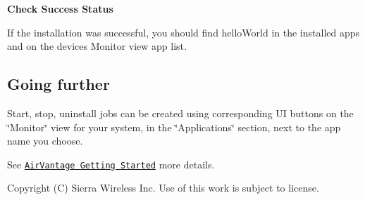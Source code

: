 {\bfseries Check Success Status}

If the installation was successful, you should find hello\+World in the installed apps and on the devices\textquotesingle{} Monitor view app list.\hypertarget{how_to_a_v_install_app_appInstallAirVantage_goingFurther}{}\subsection{Going further}\label{how_to_a_v_install_app_appInstallAirVantage_goingFurther}
Start, stop, uninstall jobs can be created using corresponding U\+I buttons on the \char`\"{}\+Monitor\char`\"{} view for your system, in the \char`\"{}\+Applications\char`\"{} section, next to the app name you choose.





See \href{https://doc.airvantage.net/display/USERGUIDE/Getting+Started}{\tt Air\+Vantage Getting Started} more details.





Copyright (C) Sierra Wireless Inc. Use of this work is subject to license. 